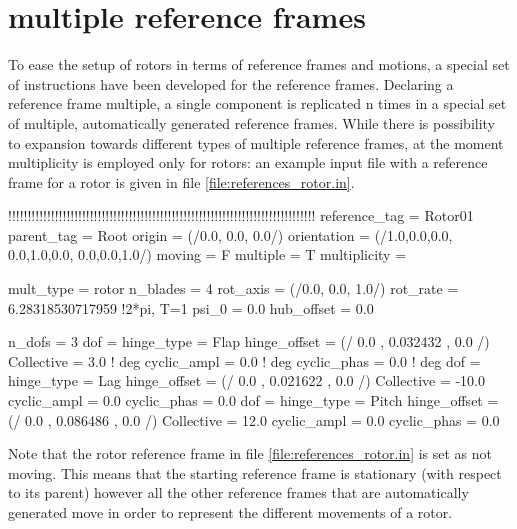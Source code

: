 \section{multiple reference frames}
To ease the setup of rotors in terms of reference frames and motions, 
a special set of instructions have been developed for the reference frames. 
Declaring a reference frame multiple, a single component is replicated n times 
in a special set of multiple, automatically generated reference frames. 
While there is possibility to expansion towards different types of multiple 
reference frames, at the moment multiplicity is employed only for rotors: an 
example input file with a reference frame for a rotor is given in file 
\ref{file:references_rotor.in}. 

\begin{inputfile}[frame=single, caption={references\_rotor.in}, label={file:references_rotor.in}]
!!!!!!!!!!!!!!!!!!!!!!!!!!!!!!!!!!!!!!!!!!!!!!!!!!!!!!!!!!!!!!!!!!!!!!!!!!!!!!!
reference_tag = Rotor01
parent_tag = Root
origin = (/0.0, 0.0, 0.0/)
orientation = (/1.0,0.0,0.0, 0.0,1.0,0.0, 0.0,0.0,1.0/)
moving = F
multiple = T
multiplicity = {
  mult_type = rotor
  n_blades = 4
  rot_axis = (/0.0, 0.0, 1.0/)
  rot_rate = 6.28318530717959 !2*pi, T=1
  psi_0 = 0.0
  hub_offset = 0.0

  n_dofs = 3
  dof = {
    hinge_type = Flap
    hinge_offset = (/ 0.0 , 0.032432 , 0.0 /)
    Collective  =  3.0     ! deg
    cyclic_ampl =  0.0     ! deg
    cyclic_phas =  0.0     ! deg
  }
  dof = {
    hinge_type = Lag
    hinge_offset = (/ 0.0 , 0.021622 , 0.0 /)
    Collective  = -10.0
    cyclic_ampl =  0.0
    cyclic_phas =  0.0
  }
  dof = {
    hinge_type = Pitch
    hinge_offset = (/ 0.0 , 0.086486 , 0.0 /)
    Collective  = 12.0
    cyclic_ampl =  0.0
    cyclic_phas =  0.0
  }

}


\end{inputfile}
Note that the rotor reference frame in file \ref{file:references_rotor.in} 
is set as not moving. This means that the starting reference frame is stationary 
(with respect to its parent) however all the other reference frames that are 
automatically generated move in order to represent the different movements of a rotor.

